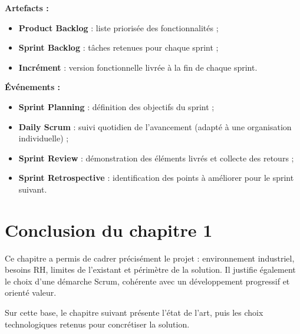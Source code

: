 \textbf{Artefacts :}
\begin{itemize}
    \item \textbf{Product Backlog} : liste priorisée des fonctionnalités ;
    \item \textbf{Sprint Backlog} : tâches retenues pour chaque sprint ;
    \item \textbf{Incrément} : version fonctionnelle livrée à la fin de
    chaque sprint.
\end{itemize}

\textbf{Événements :}
\begin{itemize}
    \item \textbf{Sprint Planning} : définition des objectifs du sprint ;
    \item \textbf{Daily Scrum} : suivi quotidien de l'avancement
    (adapté à une organisation individuelle) ;
    \item \textbf{Sprint Review} : démonstration des éléments livrés et
    collecte des retours ;
    \item \textbf{Sprint Retrospective} : identification des points à
    améliorer pour le sprint suivant.
\end{itemize}

\section*{Conclusion du chapitre 1}

Ce chapitre a permis de cadrer précisément le projet : environnement
industriel, besoins RH, limites de l'existant et périmètre de la solution.
Il justifie également le choix d'une démarche Scrum, cohérente avec un
développement progressif et orienté valeur.

Sur cette base, le chapitre suivant présente l'état de l'art, puis les
choix technologiques retenus pour concrétiser la solution.
